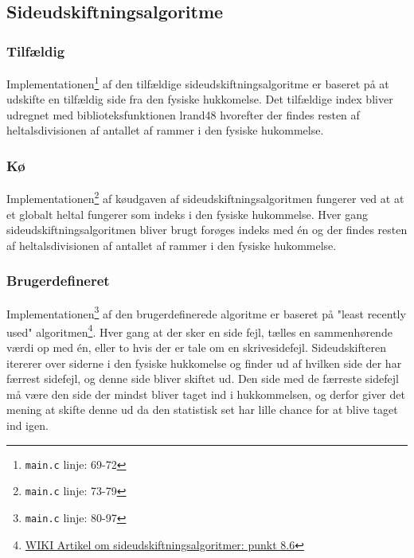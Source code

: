 \subsection{Sideudskiftningsalgoritme}
\label{pagereplacementalgorithms}
\subsubsection{Tilfældig}
Implementationen\footnote{\texttt{main.c} linje: 69-72} af den tilfældige sideudskiftningsalgoritme er baseret på at udskifte en tilfældig side fra den fysiske hukkomelse. Det tilfældige index bliver udregnet med biblioteksfunktionen lrand48 hvorefter der findes resten af heltalsdivisionen af antallet af rammer i den fysiske hukommelse.

\subsubsection{Kø}
Implementationen\footnote{\texttt{main.c} linje: 73-79} af køudgaven af sideudskiftningsalgoritmen fungerer ved at at et globalt heltal fungerer som indeks i den fysiske hukommelse. Hver gang sideudskiftningsalgoritmen bliver brugt forøges indeks med én og der findes resten af heltalsdivisionen af antallet af rammer i den fysiske hukommelse.

\subsubsection{Brugerdefineret}
Implementationen\footnote{\texttt{main.c} linje: 80-97} af den brugerdefinerede algoritme er baseret på "least recently used" algoritmen\footnote{\href{https://en.wikipedia.org/wiki/Page_replacement_algorithm}{WIKI Artikel om sideudskiftningsalgoritmer: punkt 8.6}}. Hver gang at der sker en side fejl, tælles en sammenhørende værdi op med én, eller to hvis der er tale om en skrivesidefejl. Sideudskifteren itererer over siderne i den fysiske hukkomelse og finder ud af hvilken side der har færrest sidefejl, og denne side bliver skiftet ud. Den side med de færreste sidefejl må være den side der mindst bliver taget ind i hukkommelsen, og derfor giver det mening at skifte denne ud da den statistisk set har lille chance for at blive taget ind igen.
